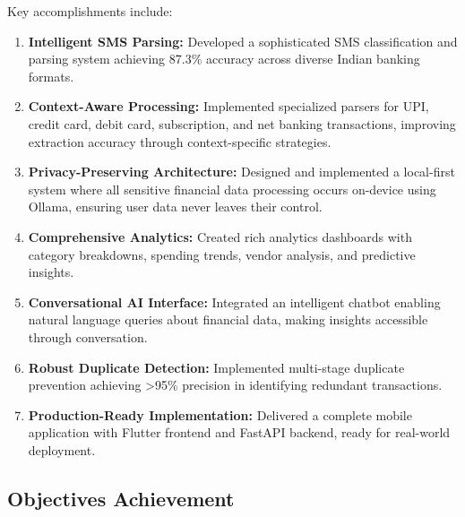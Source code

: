 \documentclass[11pt,a4paper]{report}
\begin{document}
Key accomplishments include:

\begin{enumerate}
    \item \textbf{Intelligent SMS Parsing:} Developed a sophisticated SMS classification and parsing system achieving 87.3\% accuracy across diverse Indian banking formats.
    
    \item \textbf{Context-Aware Processing:} Implemented specialized parsers for UPI, credit card, debit card, subscription, and net banking transactions, improving extraction accuracy through context-specific strategies.
    
    \item \textbf{Privacy-Preserving Architecture:} Designed and implemented a local-first system where all sensitive financial data processing occurs on-device using Ollama, ensuring user data never leaves their control.
    
    \item \textbf{Comprehensive Analytics:} Created rich analytics dashboards with category breakdowns, spending trends, vendor analysis, and predictive insights.
    
    \item \textbf{Conversational AI Interface:} Integrated an intelligent chatbot enabling natural language queries about financial data, making insights accessible through conversation.
    
    \item \textbf{Robust Duplicate Detection:} Implemented multi-stage duplicate prevention achieving >95\% precision in identifying redundant transactions.
    
    \item \textbf{Production-Ready Implementation:} Delivered a complete mobile application with Flutter frontend and FastAPI backend, ready for real-world deployment.
\end{enumerate}

\subsection{Objectives Achievement}
\end{document}
